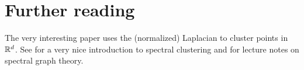 \documentclass[11pt,nocut]{article}
\begin{document}
\section*{Further reading}

The very interesting paper \cite{ng2002spectral} uses the (normalized) Laplacian to cluster points in $\mathbb{R}^d$.
See \cite{von2007tutorial} for a very nice introduction to spectral clustering and \cite{spielman2012spectral} for lecture notes on spectral graph theory.


\vspace{1cm}
\centerline{}




\end{document}
